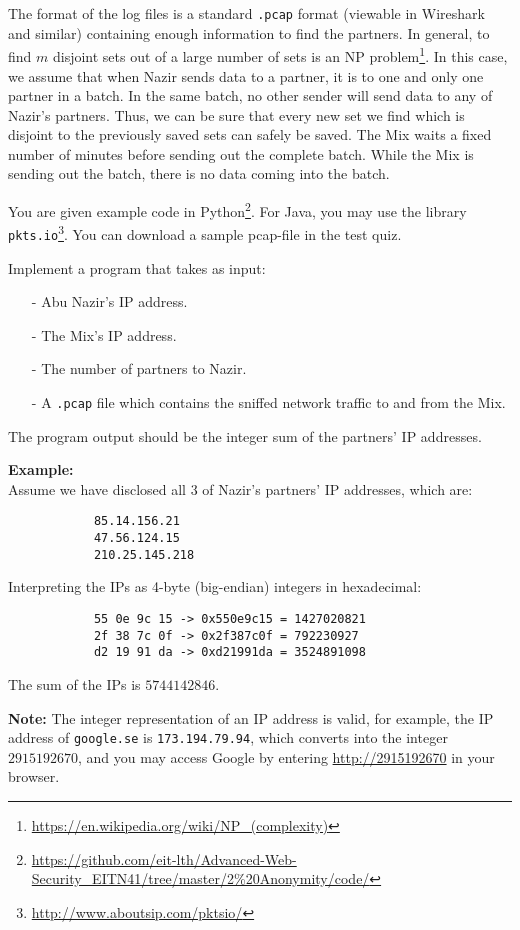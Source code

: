 \documentclass{article}
\begin{document}
\begin{description}
{		The format of the log files is a standard \texttt{.pcap} format (viewable in Wireshark and similar) containing enough information
		to find the partners. In general, to find $m$ disjoint sets out of a large number of sets is an 
		NP problem\footnote{\url{https://en.wikipedia.org/wiki/NP_(complexity)}}. In this case, we assume that when Nazir sends data to a partner,
		it is to one and only one partner in a batch. In the same batch, no other sender will send data to any of Nazir's partners. Thus,
		we can be sure that every new set we find which is disjoint to the previously saved sets can safely be saved.
		The Mix waits a fixed number of minutes before sending out the complete batch. While the Mix is sending out the batch, there is no
		data coming into the batch.

		You are given example code in Python\footnote{\url{https://github.com/eit-lth/Advanced-Web-Security_EITN41/tree/master/2\%20Anonymity/code/}}.
		For Java, you may use the library \texttt{pkts.io}\footnote{\url{http://www.aboutsip.com/pktsio/}}. You can download a sample pcap-file in the test quiz.

		Implement a program that takes as input:
		\begin{itemize}
			\item[-] Abu Nazir's IP address.
			\item[-] The Mix's IP address.
			\item[-] The number of partners to Nazir.
			\item[-] A \texttt{.pcap} file which contains the sniffed network traffic to and from the Mix.
		\end{itemize}
		The program output should be the integer sum of the partners' IP addresses. 

		\textbf{Example:}\\
		Assume we have disclosed all 3 of Nazir's partners' IP addresses, which are:
		\begin{verbatim}
			85.14.156.21
			47.56.124.15
			210.25.145.218
		\end{verbatim}
		Interpreting the IPs as 4-byte (big-endian) integers in hexadecimal:
		\begin{verbatim}
			55 0e 9c 15 -> 0x550e9c15 = 1427020821
			2f 38 7c 0f -> 0x2f387c0f = 792230927
			d2 19 91 da -> 0xd21991da = 3524891098
		\end{verbatim}
		The sum of the IPs is $5744142846$.

		\textbf{Note:} The integer representation of an IP address is valid, for example, the IP address of \texttt{google.se}
		is \texttt{173.194.79.94}, which converts into the integer $2915192670$, and you may access Google by entering
		\url{http://2915192670} in your browser.

}
\end{description}
\end{document}
